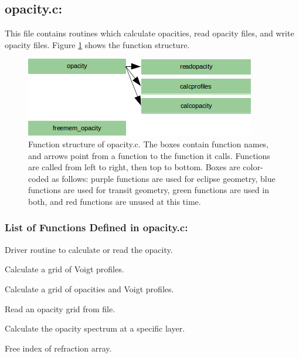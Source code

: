 \documentclass[letterpaper,12pt]{article}
\begin{document}
\newpage
\subsection{opacity.c:}
This file contains routines which calculate opacities, read opacity files, and write opacity files. Figure \ref{fig:opacityc} shows the function structure.

\begin{figure}
\includegraphics{fig/opacityc}
\caption{Function structure of opacity.c. The boxes contain function names, and arrows point from a function to the function it calls. Functions are called from left to right, then top to bottom.  Boxes are color-coded as follows:  purple functions are used for eclipse geometry, blue functions are used for transit geometry, green functions are used in both, and red functions are unused at this time.}
\label{fig:opacityc}
\end{figure}

\subsubsection{List of Functions Defined in opacity.c:}
Driver routine to calculate or read the opacity. \newline

Calculate a grid of Voigt profiles. \newline

Calculate a grid of opacities and Voigt profiles. \newline

Read an opacity grid from file. \newline

Calculate the opacity spectrum at a specific layer. \newline

Free index of refraction array. \newline
\end{document}
